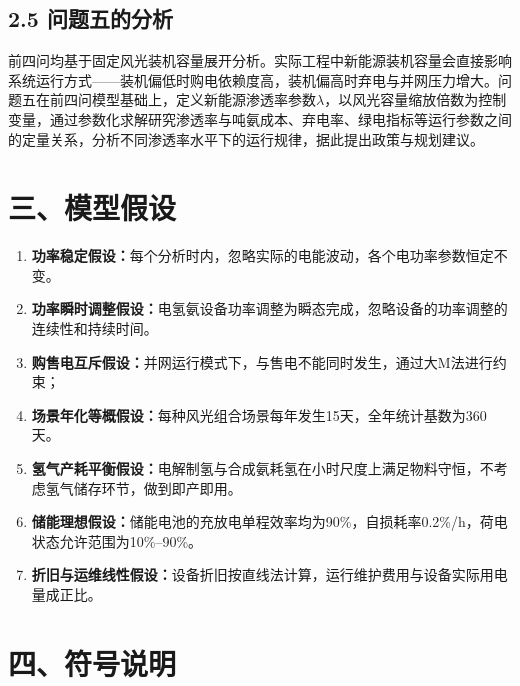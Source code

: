 \documentclass[zihao=-4,a4paper]{ctexart} %
\begin{document}
	\subsection*{2.5 问题五的分析}
	
	前四问均基于固定风光装机容量展开分析。实际工程中新能源装机容量会直接影响系统运行方式——装机偏低时购电依赖度高，装机偏高时弃电与并网压力增大。问题五在前四问模型基础上，定义新能源渗透率参数$\lambda$，以风光容量缩放倍数为控制变量，通过参数化求解研究渗透率与吨氨成本、弃电率、绿电指标等运行参数之间的定量关系，分析不同渗透率水平下的运行规律，据此提出政策与规划建议。
	
	\section*{三、模型假设}
	\begin{enumerate}
		\item \textbf{功率稳定假设：}每个分析时内，忽略实际的电能波动，各个电功率参数恒定不变。
		\item \textbf{功率瞬时调整假设：}电氢氨设备功率调整为瞬态完成，忽略设备的功率调整的连续性和持续时间。
		\item \textbf{购售电互斥假设：}并网运行模式下，与售电不能同时发生，通过大M法进行约束；
		\item \textbf{场景年化等概假设：}每种风光组合场景每年发生15天，全年统计基数为360天。
		\item \textbf{氢气产耗平衡假设：}电解制氢与合成氨耗氢在小时尺度上满足物料守恒，不考虑氢气储存环节，做到即产即用。
		\item \textbf{储能理想假设：}储能电池的充放电单程效率均为90\%，自损耗率0.2\%/h，荷电状态允许范围为10\%--90\%。
		\item \textbf{折旧与运维线性假设：}设备折旧按直线法计算，运行维护费用与设备实际用电量成正比。
	\end{enumerate}
	
	\newpage
	\section*{四、符号说明}
	
\end{document}
